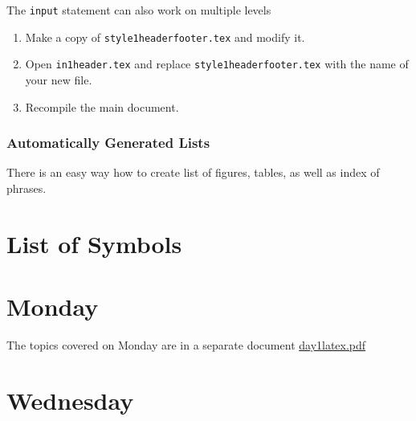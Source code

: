 \documentclass[a4paper,10pt]{report} %
\begin{document}
The \texttt{input} statement can also work on multiple levels
\begin{enumerate}
    \item Make a copy of \texttt{style1headerfooter.tex} and modify it.
    \item Open \texttt{in1header.tex} and replace \texttt{style1headerfooter.tex} with the name of your new file.
    \item Recompile the main document.
\end{enumerate}



\subsection{Automatically Generated Lists}\label{sec:automatic}
There is an easy way how to create list of figures, tables, as well as index of phrases. 

%  


  \tableofcontents 
   \label{contents}
   \listoftables  
   \listoffigures
   \newpage 
   \lstlistoflistings
   \label{listings}  
   \chapter*{List of Symbols}
   
\newpage

\chapter{Monday} \label{chap:monday}
 \pagestyle{fancy}
 
 The topics covered on Monday are in a separate document \href{./day1latex.pdf}{day1latex.pdf}

 \newpage 
 
  
\chapter{Wednesday} \label{chap:wednesday}

 
\end{document}
